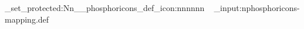 \documentclass{article}
\begin{document}
\ExplSyntaxOn
\cs_set_protected:Nn\__phosphoricons_def_icon:nnnnnn{
  ~
}
\file_input:n{phosphoricons-mapping.def}
\ExplSyntaxOff
\end{document}
